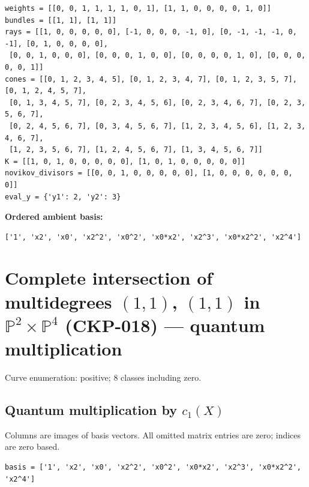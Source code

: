 \documentclass[10pt,a4paper]{article}
\begin{document}
\begin{lstlisting}
weights = [[0, 0, 1, 1, 1, 1, 0, 1], [1, 1, 0, 0, 0, 0, 1, 0]]
bundles = [[1, 1], [1, 1]]
rays = [[1, 0, 0, 0, 0, 0], [-1, 0, 0, 0, -1, 0], [0, -1, -1, -1, 0, -1], [0, 1, 0, 0, 0, 0],
 [0, 0, 1, 0, 0, 0], [0, 0, 0, 1, 0, 0], [0, 0, 0, 0, 1, 0], [0, 0, 0, 0, 0, 1]]
cones = [[0, 1, 2, 3, 4, 5], [0, 1, 2, 3, 4, 7], [0, 1, 2, 3, 5, 7], [0, 1, 2, 4, 5, 7],
 [0, 1, 3, 4, 5, 7], [0, 2, 3, 4, 5, 6], [0, 2, 3, 4, 6, 7], [0, 2, 3, 5, 6, 7],
 [0, 2, 4, 5, 6, 7], [0, 3, 4, 5, 6, 7], [1, 2, 3, 4, 5, 6], [1, 2, 3, 4, 6, 7],
 [1, 2, 3, 5, 6, 7], [1, 2, 4, 5, 6, 7], [1, 3, 4, 5, 6, 7]]
K = [[1, 0, 1, 0, 0, 0, 0, 0], [1, 0, 1, 0, 0, 0, 0, 0]]
novikov_divisors = [[0, 0, 1, 0, 0, 0, 0, 0], [1, 0, 0, 0, 0, 0, 0, 0]]
eval_y = {'y1': 2, 'y2': 3}
\end{lstlisting}

\textbf{Ordered ambient basis:}
\begin{lstlisting}
['1', 'x2', 'x0', 'x2^2', 'x0^2', 'x0*x2', 'x2^3', 'x0*x2^2', 'x2^4']
\end{lstlisting}

\clearpage\section*{Complete intersection of multidegrees $(1,1)$, $(1,1)$ in $\mathbb P^{2}\times \mathbb P^{4}$ (CKP-018) --- quantum multiplication}

Curve enumeration: positive; 8 classes including zero.
\subsection*{Quantum multiplication by $c_1(X)$}
Columns are images of basis vectors. All omitted matrix entries are zero; indices are zero based.

\begin{lstlisting}
basis = ['1', 'x2', 'x0', 'x2^2', 'x0^2', 'x0*x2', 'x2^3', 'x0*x2^2', 'x2^4']
\end{lstlisting}
\end{document}
